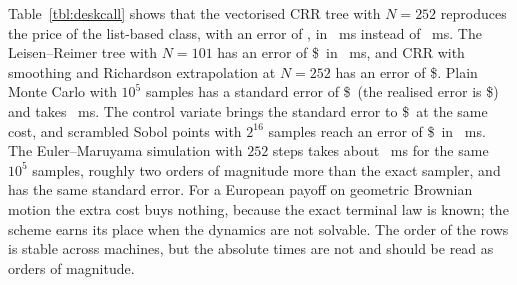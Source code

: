 Table~\ref{tbl:deskcall} shows that the vectorised CRR tree with $N=252$ reproduces the price of the list-based class, with an error of \DeskCrrVecErr, in \DeskCrrVecMs\ ms instead of \DeskCrrClassMs\ ms.
The Leisen--Reimer tree with $N=101$ has an error of \$\DeskLrErr\ in \DeskLrMs\ ms, and CRR with smoothing and Richardson extrapolation at $N=252$ has an error of \$\DeskSmoothErr.
Plain Monte Carlo with $10^5$ samples has a standard error of \$\DeskMcPlainSE\ (the realised error is \$\DeskMcPlainErr) and takes \DeskMcPlainMs\ ms.
The control variate brings the standard error to \$\DeskMcCvSE\ at the same cost, and scrambled Sobol points with $2^{16}$ samples reach an error of \$\DeskSobolErr\ in \DeskSobolMs\ ms.
The Euler--Maruyama simulation with $252$ steps takes about \DeskMcEulerMs\ ms for the same $10^5$ samples, roughly two orders of magnitude more than the exact sampler, and has the same standard error.
For a European payoff on geometric Brownian motion the extra cost buys nothing, because the exact terminal law is known; the scheme earns its place when the dynamics are not solvable.
The order of the rows is stable across machines, but the absolute times are not and should be read as orders of magnitude.
